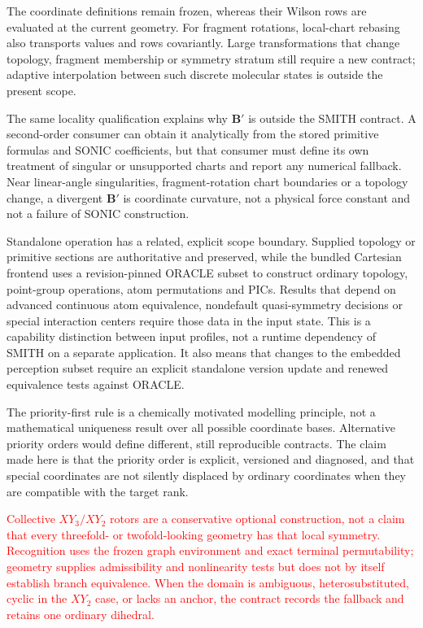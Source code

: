 \documentclass[journal=jctcce,manuscript=article,layout=traditional]{achemso}
\newcommand{\Bmat}{\mathbf{B}}
\theoremstyle{definition}
\begin{document}
The coordinate definitions remain frozen, whereas their Wilson rows are
evaluated at the current geometry.  For fragment rotations, local-chart
rebasing also transports values and rows covariantly.  Large transformations
that change topology, fragment membership or symmetry stratum still require a
new contract; adaptive interpolation between such discrete molecular states is
outside the present scope.

The same locality qualification explains why \(\Bmat'\) is outside the SMITH
contract.  A second-order consumer can obtain it analytically from the stored
primitive formulas and SONIC coefficients, but that consumer must define its
own treatment of singular or unsupported charts and report any numerical
fallback.  Near linear-angle singularities, fragment-rotation chart boundaries
or a topology change, a divergent \(\Bmat'\) is coordinate curvature, not a
physical force constant and not a failure of SONIC construction.

Standalone operation has a related, explicit scope boundary.  Supplied
topology or primitive sections are authoritative and preserved, while the
bundled Cartesian frontend uses a revision-pinned ORACLE subset to construct
ordinary topology, point-group operations, atom permutations and PICs.  Results
that depend on advanced continuous atom equivalence, nondefault quasi-symmetry
decisions or special interaction centers require those data in the input state.
This is a capability distinction between input profiles, not a runtime
dependency of SMITH on a separate application.  It also means that changes to
the embedded perception subset require an explicit standalone version update
and renewed equivalence tests against ORACLE.

The priority-first rule is a chemically motivated modelling principle, not a
mathematical uniqueness result over all possible coordinate bases.  Alternative
priority orders would define different, still reproducible contracts.  The
claim made here is that the priority order is explicit, versioned and
diagnosed, and that special coordinates are not silently displaced by
ordinary coordinates when they are compatible with the target rank.

\textcolor{red}{Collective \(XY_3/XY_2\) rotors are a conservative optional
construction, not a claim that every threefold- or twofold-looking geometry
has that local symmetry.  Recognition uses the frozen graph environment and
exact terminal permutability; geometry supplies admissibility and nonlinearity
tests but does not by itself establish branch equivalence.  When the domain is
ambiguous, heterosubstituted, cyclic in the \(XY_2\) case, or lacks an anchor,
the contract records the fallback and retains one ordinary dihedral.}
\end{document}
